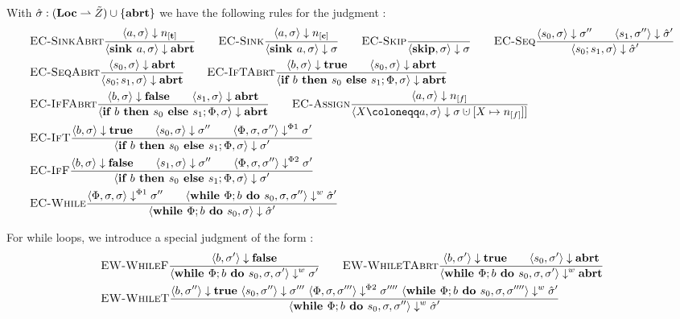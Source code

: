 \begin{landscape}
With $\hat{\sigma}{}: (\textbf{Loc} \rightharpoonup \tilde{Z}) \cup \{\textbf{abrt}\}$ we have the following rules for the
 judgment :
\begin{align*}
    &\bsrule{EC-SinkAbrt}{\bigstep{a}{\store}{\tracked{}}}
    {\bigstep{\defaultsink}{\store}{\exception}} \qquad
    \bsrule{EC-Sink}{\bigstep{a}{\store}{\clean{}}}
    {\bigstep{\defaultsink}{\store}{\store}} \qquad
    \bsrule{EC-Skip}{}{\bigstep{\skipcmd}{\store}{\store}}\qquad
    \bsrule{EC-Seq}{\bigstep{s_0}{\sigma}{\store''} \qquad \bigstep{s_1}{\store''}{\excstore'}}
    {\bigstep{\defaultssaseq}{\store}{\excstore'}}\\
    &\bsrule{EC-SeqAbrt}{\bigstep{s_0}{\sigma}{\exception}}
    {\bigstep{\defaultssaseq}{\store}{\exception}} \qquad
    \bsrule{EC-IfTAbrt}{\bigstep{b}{\store}{\btrue}\qquad \bigstep{s_0}{\store}{\exception}}
    {\bigstep{\defaultssaif}{\store}{\exception}}\\
    &\bsrule{EC-IfFAbrt}{\bigstep{b}{\store}{\bfalse}\qquad \bigstep{s_1}{\store}{\exception}}
    {\bigstep{\defaultssaif}{\store}{\exception}}\qquad
    \bsrule{EC-Assign}{\bigstep{a}{\store}{\flagged{}}}
    {\bigstep{\defaultstore}{\store}{\storeassign{\store}{X \mapsto \flagged{}]}}}\\
    &\bsrule{EC-IfT}{\bigstep{b}{\store}{\btrue}\qquad \bigstep{s_0}{\store}{\store''}
    \qquad \bigsteppl{\philist}{\store}{\store''}{\store'}}
    {\bigstep{\defaultssaif}{\store}{\store'}}\\
    &\bsrule{EC-IfF}{\bigstep{b}{\store}{\bfalse}\qquad \bigstep{s_1}{\store}{\store''}
    \qquad \bigsteppr{\philist}{\store}{\store''}{\store'}}
    {\bigstep{\defaultssaif}{\store}{\store'}}\\
    &\bsrule{EC-While}{\bigsteppl{\philist}{\store}{\store}{\store''} \qquad
    \bigstepw{\defaultssawhile}{\store}{\store''}{\excstore'}}
    {\bigstep{\defaultssawhile}{\store}{\excstore'}}\\
\end{align*}

For while loops, we introduce a special judgment of the form :
\begin{align*}
    &\bsrule{EW-WhileF}{\bigstep{b}{\store'}{\bfalse}}
    {\bigstepw{\defaultssawhile}{\store}{\store'}{\store'}}\qquad
    \bsrule{EW-WhileTAbrt}{\bigstep{b}{\store'}{\btrue} \qquad 
    \bigstep{s_0}{\store'}{\exception}}
    {\bigstepw{\defaultssawhile}{\store}{\store'}{\exception}}\\
    &\bsrule{EW-WhileT}{\bigstep{b}{\store''}{\btrue} \  
    \bigstep{s_0}{\store''}{\store'''} \  
    \bigsteppr{\philist}{\store}{\store'''}{\store''''} \ 
    \bigstepw{\defaultssawhile}{\store}{\store''''}{\excstore'}}
    {\bigstepw{\defaultssawhile}{\store}{\store''}{\excstore'}}\\
\end{align*}
\end{landscape}
